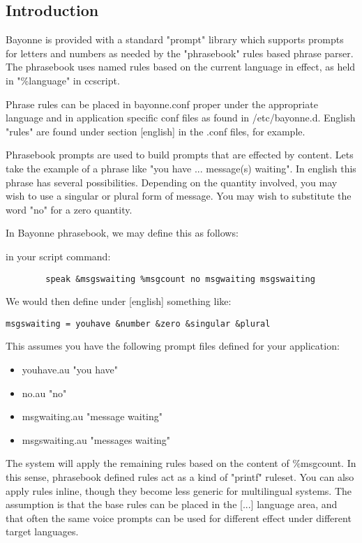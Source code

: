 \documentclass[a4paper,12pt]{article}
\begin{document}
{{{{{{{{\subsection{Introduction}
Bayonne is provided with a standard "prompt" library which supports
prompts for letters and numbers as needed by the "phrasebook" rules
based phrase parser. The phrasebook uses named rules based on the 
current language in effect, as held in "\%language" in ccscript.

Phrase rules can be placed in bayonne.conf proper under the appropriate
language and in application specific conf files as found in
/etc/\-bayonne.d.  English "rules" are found under section [english] in 
the .conf files, for example.

Phrasebook prompts are used to build prompts that are effected by content.
Lets take the example of a phrase like "you have ... message(s) waiting".
In english this phrase has several possibilities.  Depending on the
quantity involved, you may wish to use a singular or plural form of
message.  You may wish to substitute the word "no" for a zero quantity.

In Bayonne phrasebook, we may define this as follows:

in your script command:

\begin{verbatim}
        speak &msgswaiting %msgcount no msgwaiting msgswaiting
\end{verbatim}

We would then define under [english] something like:

\begin{verbatim}
msgswaiting = youhave &number &zero &singular &plural
\end{verbatim}

This assumes you have the following prompt files defined for your
application:
\begin{itemize}
        \item youhave.au "you have" 
        \item no.au "no" 
        \item msgwaiting.au "message waiting" 
        \item msgswaiting.au "messages waiting" 
\end{itemize}
The system will apply the remaining rules based on the content of
\%msgcount.  In this sense, phrasebook defined rules act as a kind of
"printf" ruleset.  You can also apply rules inline, though they become
less generic for multilingual systems.  The assumption is that the base
rules can be placed in the [...] language area, and that often the
same voice prompts can be used for different effect under different
target languages.

}}}}}}}}
\end{document}
